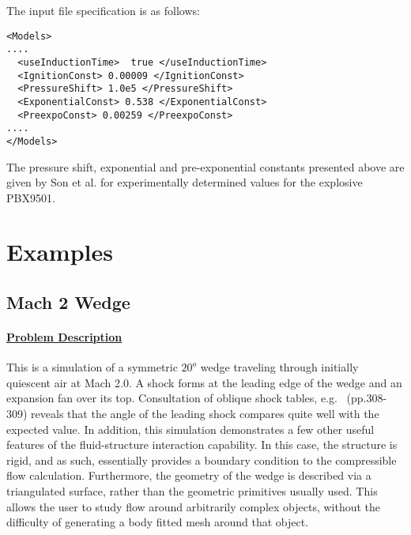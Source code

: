 The input file specification is as follows:
\begin{verbatim}
<Models>
....
  <useInductionTime>  true </useInductionTime>
  <IgnitionConst> 0.00009 </IgnitionConst>
  <PressureShift> 1.0e5 </PressureShift>
  <ExponentialConst> 0.538 </ExponentialConst>
  <PreexpoConst> 0.00259 </PreexpoConst>
....
</Models> 
\end{verbatim}

The pressure shift, exponential and pre-exponential constants presented above are given by Son et al. \cite{flameProp} for experimentally determined values for the explosive PBX9501.


\newpage

\section{Examples} \label {Sec:MPMICE_EXAMPLES}

\subsection*{\center Mach 2 Wedge}
\paragraph*{\underline{Problem Description}}
This is a simulation of a symmetric $20^o$ wedge traveling through initially
quiescent air at Mach 2.0.  A shock forms at the leading edge of the
wedge and an expansion fan over its top.  Consultation of oblique shock
tables, e.g.~\cite{ref:Saad} (pp.308-309) reveals that the angle of the leading
shock compares quite well with the expected value.  In addition, this
simulation demonstrates a few other useful features of the fluid-structure
interaction capability.  In this case, the structure is rigid, and as
such, essentially provides a boundary condition to the compressible flow
calculation.  Furthermore, the geometry of the wedge is described via a
triangulated surface, rather than the geometric primitives usually used.
This allows the user to study flow around arbitrarily complex objects,
without the difficulty of generating a body fitted mesh around that object.


